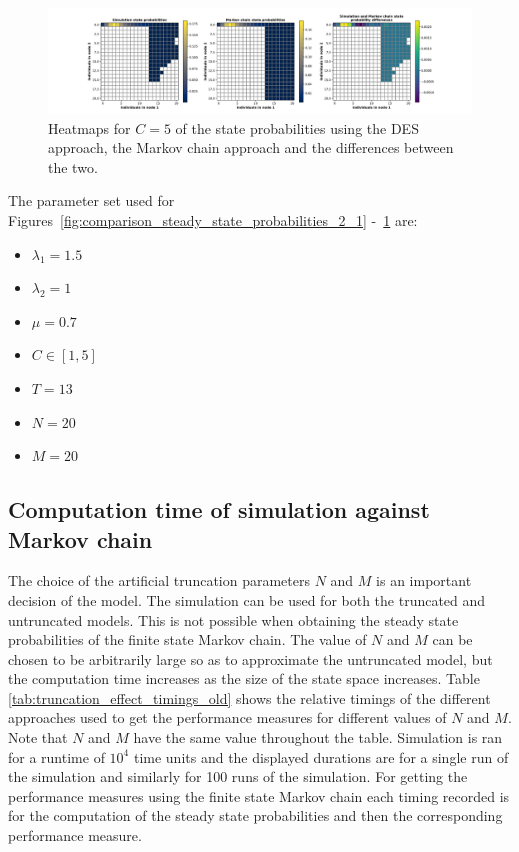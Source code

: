 \begin{figure}[H]
    \includegraphics[width=\textwidth, trim=100 10 100 10, clip]{chapters/03_queueing_model/Bin/numeric_results_and_timings/steady_state_probabilities_2/main_5.pdf}
    \caption{Heatmaps for \(C = 5\) of the state probabilities using the
    DES approach, the Markov chain approach and the differences between the
    two.}
    \label{fig:comparison_steady_state_probabilities_2_5}
\end{figure}


The parameter set used for
Figures~\ref{fig:comparison_steady_state_probabilities_2_1}
-~\ref{fig:comparison_steady_state_probabilities_2_5} are:

\begin{multicols}{3}
    \begin{itemize}
        \item \(\lambda_1 = 1.5\)
        \item \(\lambda_2 = 1\)
        \item \(\mu = 0.7\)
        \item \(C \in [1, 5]\)
        \item \(T = 13\)
        \item \(N = 20\)
        \item \(M = 20\)
    \end{itemize}    
\end{multicols}


\subsection{Computation time of simulation against Markov chain }

The choice of the artificial truncation parameters \(N\) and \(M\) is an
important decision of the model.
The simulation can be used for both the truncated and untruncated models.
This is not possible when obtaining the steady state probabilities of the
finite state Markov chain.
The value of \(N\) and \(M\) can be chosen to be arbitrarily large so as to
approximate the untruncated model, but the
computation time increases as the size of the state space increases.
Table \ref{tab:truncation_effect_timings_old} shows the relative timings of the
different approaches used to get the performance measures for different values
of \(N\) and \(M\).
Note that \(N\) and \(M\) have the same value throughout the table.
Simulation is ran for a runtime of \(10^4\) time units and the displayed
durations are for a single run of the simulation and similarly for 100 runs of
the simulation.
For getting the performance measures using the finite state Markov chain each
timing recorded is for the computation of the steady state probabilities and
then the corresponding performance measure.

